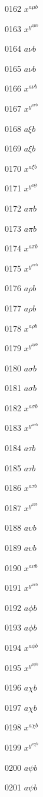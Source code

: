 \documentclass{article}
\begin{document}
0162 $x^{a\mu b}$\par
0163 $x^{y^{a\mu b}}$\par
0164 $a\nu b$\par
0165 $\displaystyle a\nu b$\par
0166 $x^{a\nu b}$\par
0167 $x^{y^{a\nu b}}$\par
0168 $a\xi b$\par
0169 $\displaystyle a\xi b$\par
0170 $x^{a\xi b}$\par
0171 $x^{y^{a\xi b}}$\par
0172 $a\pi b$\par
0173 $\displaystyle a\pi b$\par
0174 $x^{a\pi b}$\par
0175 $x^{y^{a\pi b}}$\par
0176 $a\rho b$\par
0177 $\displaystyle a\rho b$\par
0178 $x^{a\rho b}$\par
0179 $x^{y^{a\rho b}}$\par
0180 $a\sigma b$\par
0181 $\displaystyle a\sigma b$\par
0182 $x^{a\sigma b}$\par
0183 $x^{y^{a\sigma b}}$\par
0184 $a\tau b$\par
0185 $\displaystyle a\tau b$\par
0186 $x^{a\tau b}$\par
0187 $x^{y^{a\tau b}}$\par
0188 $a\upsilon b$\par
0189 $\displaystyle a\upsilon b$\par
0190 $x^{a\upsilon b}$\par
0191 $x^{y^{a\upsilon b}}$\par
0192 $a\phi b$\par
0193 $\displaystyle a\phi b$\par
0194 $x^{a\phi b}$\par
0195 $x^{y^{a\phi b}}$\par
0196 $a\chi b$\par
0197 $\displaystyle a\chi b$\par
0198 $x^{a\chi b}$\par
0199 $x^{y^{a\chi b}}$\par
0200 $a\psi b$\par
0201 $\displaystyle a\psi b$\par
\end{document}
